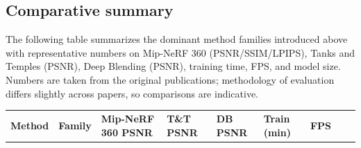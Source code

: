\subsection{Comparative summary}\label{comparative-summary}

The following table summarizes the dominant method families introduced above with representative numbers on Mip-NeRF 360 (PSNR/SSIM/LPIPS), Tanks and Temples (PSNR), Deep Blending (PSNR), training time, FPS, and model size. Numbers are taken from the original publications; methodology of evaluation differs slightly across papers, so comparisons are indicative.

{\def\LTcaptype{none} %
\begin{longtable}[]{@{}
  >{\raggedright\arraybackslash}p{}
  >{\raggedright\arraybackslash}p{}
  >{\raggedright\arraybackslash}p{}
  >{\raggedright\arraybackslash}p{}
  >{\raggedright\arraybackslash}p{}
  >{\raggedright\arraybackslash}p{}
  >{\raggedright\arraybackslash}p{}
  >{\raggedright\arraybackslash}p{}
  >{\raggedright\arraybackslash}p{}@{}}
\toprule\noalign{}
\begin{minipage}[b]{\linewidth}\raggedright
\textbf{Method}
\end{minipage} & \begin{minipage}[b]{\linewidth}\raggedright
\textbf{Family}
\end{minipage} & \begin{minipage}[b]{\linewidth}\raggedright
\textbf{Mip-NeRF 360 PSNR}
\end{minipage} & \begin{minipage}[b]{\linewidth}\raggedright
\textbf{T\&T PSNR}
\end{minipage} & \begin{minipage}[b]{\linewidth}\raggedright
\textbf{DB PSNR}
\end{minipage} & \begin{minipage}[b]{\linewidth}\raggedright
\textbf{Train (min)}
\end{minipage} & \begin{minipage}[b]{\linewidth}\raggedright
\textbf{FPS}
\end{minipage} & \begin{minipage}[b]{\linewidth}\raggedright

\end{minipage}
\end{longtable}}
